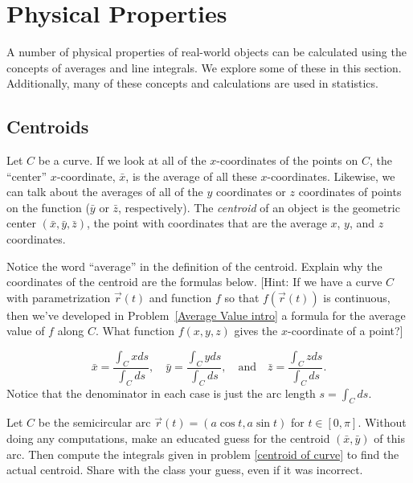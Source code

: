 \section{Physical Properties}

A number of physical properties of real-world objects can be calculated using the concepts of averages and line integrals.  We explore some of these in this section.  Additionally, many of these concepts and calculations are used in statistics.

\subsection{Centroids}%

\begin{definition}[Centroid]
  Let $C$ be a curve. If we look at all of the $x$-coordinates of the points on $C$, the ``center'' $x$-coordinate, $\bar x$, is the average of all these $x$-coordinates.  Likewise, we can talk about the averages of all of the $y$ coordinates or $z$ coordinates of points on the function ($\bar y$ or $\bar z$, respectively).  The \emph{centroid} of an object is the geometric center $(\bar x, \bar y, \bar z)$, the point with coordinates that are the average $x$, $y$, and $z$ coordinates.
\end{definition}

\begin{problem}[Centroid]\label{centroid of curve}%
  Notice the word ``average'' in the definition of the centroid. Explain why the coordinates of the centroid are the formulas below. [Hint:  If we have a curve $C$ with parametrization $\vec r(t)$ and function $f$ so that $f(\vec r(t))$ is continuous, then we've developed in Problem~\ref{Average Value intro} a formula for the average value of $f$ along $C$.  What function $f(x,y,z)$ gives the $x$-coordinate of a point?]

$$
\bar x = \frac{\int_C x ds}{\int_C  ds},\quad
\bar y = \frac{\int_C y ds}{\int_C  ds},\quad 
\text{and}\quad
\bar z = \frac{\int_C z ds}{\int_C  ds}.
$$
Notice that the denominator in each case is just the arc length $s=\int_C ds$. 
\end{problem}


\begin{problem}\label{semicircle centroid}
 Let $C$ be the semicircular arc $\vec r(t)=(a\cos t, a\sin t)$ for $t\in[0,\pi]$. Without doing any computations, make an educated guess for the centroid $(\bar x, \bar y)$ of this arc.  Then compute the integrals given in problem \ref{centroid of curve} to find the actual centroid. Share with the class your guess, even if it was incorrect. 
\end{problem}

